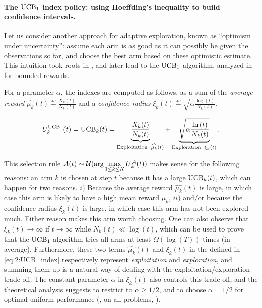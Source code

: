 \paragraph{The $\mathrm{UCB}_1$ index policy: using Hoeffding's inequality to build confidence intervals.}
%
Let us consider another approach for adaptive exploration, known as ``optimism under uncertainty'': assume each arm is as good as it can possibly be given the observations so far, and choose the best arm based on these optimistic estimate.
%
This intuition took roots in \cite{LaiRobbins85}, and later lead to the $\mathrm{UCB}_1$ algorithm, analyzed in \cite{Auer02} for bounded rewards.

For a parameter $\alpha$, the \UCB{} indexes are computed as follows, as a sum of
the \emph{average reward} $\widehat{\mu_k}(t) \eqdef \frac{X_k(t)}{N_k(t)}$
and a \emph{confidence radius} $\xi_k(t) \eqdef \sqrt{\alpha \frac{\log\left(t\right)}{N_k(t)}}$.

\begin{align}\label{eq:2:UCB_index}
    U_k^{\mathrm{UCB}_1}(t) = \mathrm{UCB}_k(t) \overset{.}{=} \underbrace{\frac{X_k(t)}{N_k(t)}}_{\text{Exploitation }\; \widehat{\mu_k}(t)} + \underbrace{\sqrt{\alpha \frac{\ln\left(t\right)}{N_k(t)}}}_{\text{Exploration }\; \xi_k(t)}.
\end{align}

This selection rule $A(t) \sim \mathcal{U}(\arg\max\limits_{1\leq k \leq K} U_k^{\mathcal{A}}(t))$ makes sense for the following reasons:
an arm $k$ is chosen at step $t$ because it has a large $\mathrm{UCB}_k(t)$, which can happen for two reasons.
$i)$ Because the average reward $\widehat{\mu_k}(t)$ is large, in which case this arm is likely to have a high mean reward $\mu_k$,
$ii)$ and/or because the confidence radius $\xi_k(t)$ is large, in which case this arm has not been explored much.
Either reason makes this arm worth choosing.
One can also observe that $\xi_k(t)\to\infty$ if $t\to\infty$ while $N_k(t)\ll\log(t)$, which can be used to prove that the $\mathrm{UCB}_1$ algorithm tries all arms at least $\Omega(\log(T))$ times (in average).
%
Furthermore, these two terms $\widehat{\mu_k}(t)$ and $\xi_k(t)$ in the \UCB{} defined in \eqref{eq:2:UCB_index} respectively represent \emph{exploitation} and \emph{exploration}, and summing them up is a natural way of dealing with the exploitation/exploration trade off.
The constant parameter $\alpha$ in $\xi_k(t)$ also controls this trade-off, and the theoretical analysis suggests to restrict to $\alpha\geq1/2$, and to choose $\alpha=1/2$ for optimal uniform performance (\ie, on all problems, \cite{Auer02}).

